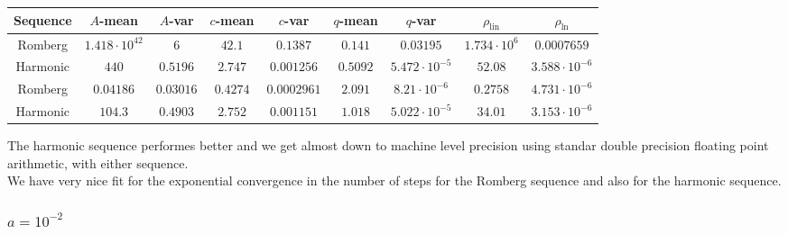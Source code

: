 \begin{table}[H]
    \centering
    \small
    \begin{tabular}{c||c|c|c|c|c|c|c|c}
Sequence & \(A\)-mean & \(A\)-var & \(c\)-mean & \(c\)-var & \(q\)-mean & \(q\)-var & \(\rho_{\operatorname{lin}}\) & \(\rho_{\ln}\)\\\hline
\rowcolor{red}
Romberg & \(1.418\cdot 10^{42}\) & \(6\) & \(42.1\) & \(0.1387\) & \(0.141\) & \(0.03195\) & \(1.734\cdot 10^6\) & \(0.0007659\) \\
\rowcolor{green}
Harmonic & \(440\) & \(0.5196\) & \(2.747\) & \(0.001256\) & \(0.5092\) & \(5.472\cdot 10^{-5}\) & \(52.08\) & \(3.588\cdot 10^{-6}\) \\
\rowcolor{green}
Romberg & \(0.04186\) & \(0.03016\) & \(0.4274\) & \(0.0002961\) & \(2.091\) & \(8.21\cdot 10^{-6}\) & \(0.2758\) & \(4.731\cdot 10^{-6}\) \\
\rowcolor{green}
Harmonic & \(104.3\) & \(0.4903\) & \(2.752\) & \(0.001151\) & \(1.018\) & \(5.022\cdot 10^{-5}\) & \(34.01\) & \(3.153\cdot 10^{-6}\) \\
    \end{tabular}
    \label{tab:my_label}
\end{table}

The harmonic sequence performes better and we get almost down to machine level precision using standar double precision floating point arithmetic, with either sequence.\\

We have very nice fit for the exponential convergence in the number of steps for the Romberg sequence and also for the harmonic sequence.

\subsubsection{\(a = 10^{-2}\)}

